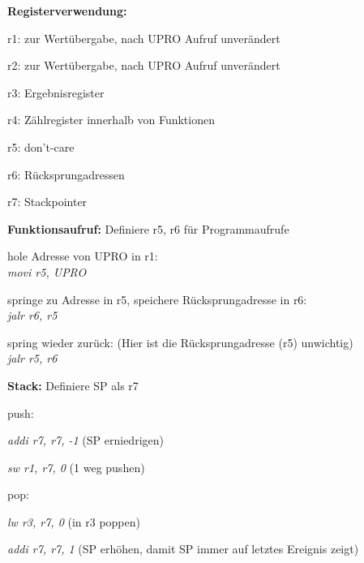 \documentclass[fleqn, a4paper, 11pt]{article}       %
\begin{document}
 \textbf{Registerverwendung:}
 \begin{compactitem}
     \item r1: zur Wertübergabe, nach UPRO Aufruf unverändert
     \item r2: zur Wertübergabe, nach UPRO Aufruf unverändert
     \item r3: Ergebnisregister
     \item r4: Zählregister innerhalb von Funktionen
     \item r5: don't-care
     \item r6: Rücksprungadressen
     \item r7: Stackpointer
 \end{compactitem}
 \vspace{0.25cm}
 \noindent \textbf{Funktionsaufruf:}
     Definiere r5, r6 für Programmaufrufe
     \begin{compactenum}
     \item hole Adresse von UPRO in r1:\\
         \emph{movi r5, UPRO} 
     \item springe zu Adresse in r5, speichere Rücksprungadresse in r6:\\
         \emph{jalr r6, r5}
     \item spring wieder zurück: (Hier ist die Rücksprungadresse (r5) unwichtig)\\
         \emph{jalr r5, r6 }
     \end{compactenum}
     
\vspace{0.25cm}
      
 \noindent \textbf{Stack:}
     Definiere SP als r7
     \begin{compactitem}
         \item push:
         \begin {compactitem}
                  \item \emph{addi r7, r7, -1}           (SP erniedrigen)
                   \item \emph{sw  r1, r7, 0 }            (1 weg pushen)
           \end{compactitem}         
         \item pop:
             \begin{compactitem}
                   \item \emph{lw r3, r7, 0 }             (in r3 poppen) 
                   \item \emph{addi r7, r7, 1  }          (SP erhöhen, damit SP immer auf letztes Ereignis zeigt)
             \end{compactitem}                                 
         \end{compactitem}  
 
\end{document}

